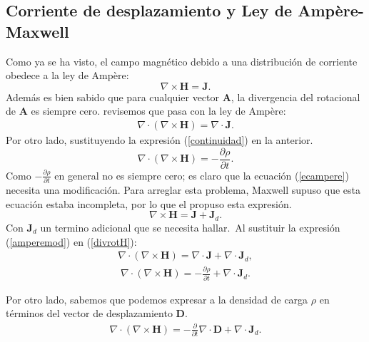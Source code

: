 \documentclass[11pt,fleqn]{book} %
\begin{document}
\subsection{Corriente de desplazamiento y Ley de Amp\`ere-Maxwell}

Como ya se ha visto, el campo magn\'etico debido a una distribuci\'on de corriente obedece a la ley de Ampère:
\begin{equation}
\nabla \times \textbf{H}= \textbf{J}. \label{ecampere}
\end{equation}
Adem\'as es bien sabido que para cualquier vector $\textbf{A}$, la divergencia del rotacional de $\textbf{A}$ es siempre cero. revisemos que pasa con la ley de Ampère:
\begin{eqnarray*}
\nabla \cdot(\nabla \times \textbf{H})=\nabla \cdot \textbf{J}.
\end{eqnarray*}
Por otro lado, sustituyendo la expresi\'on (\ref{continuidad}) en la anterior.
\begin{equation}
\nabla \cdot(\nabla \times \textbf{H})=-\frac{\partial \rho}{\partial t}. \label{divrotH}
\end{equation}
Como $-\frac{\partial \rho}{\partial t}$ en general no es siempre cero; es claro que la ecuaci\'on (\ref{ecampere}) necesita una modificaci\'on.
Para arreglar esta problema, Maxwell supuso que esta ecuaci\'on estaba incompleta, por lo que el propuso esta expresi\'on.
\begin{equation}
\nabla \times \textbf{H}= \textbf{J}+\textbf{J}_{d}.  \label{amperemod}
\end{equation}
Con $\textbf{J}_{d}$ un termino adicional que se necesita hallar.\
Al sustituir la expresi\'on (\ref{amperemod}) en (\ref{divrotH}):
\begin{eqnarray*}
\nabla \cdot(\nabla \times \textbf{H})=\nabla \cdot \textbf{J}+\nabla \cdot \textbf{J}_{d},
\end{eqnarray*}
\begin{eqnarray*}
\nabla \cdot(\nabla \times \textbf{H})=-\frac{\partial \rho}{\partial t}+\nabla \cdot \textbf{J}_{d}.
\end{eqnarray*}

Por otro lado, sabemos que podemos expresar a la densidad de carga $\rho$ en t\'erminos del vector de desplazamiento $\textbf{D}$.
\begin{eqnarray*}
\nabla \cdot(\nabla \times \textbf{H})=-\frac{\partial}{\partial t} \nabla \cdot \textbf{D} +\nabla \cdot \textbf{J}_{d}.
\end{eqnarray*}
\end{document}
